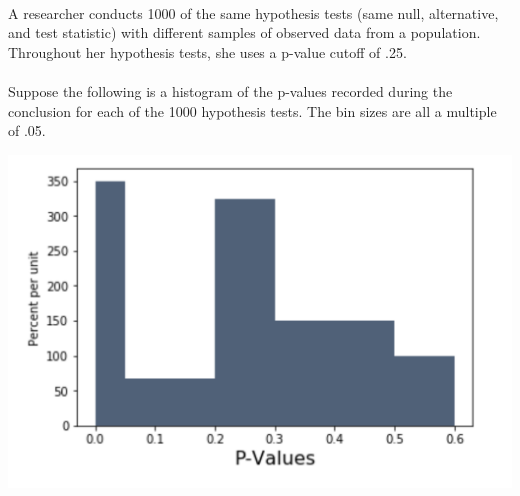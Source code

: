  \\ 

A researcher conducts 1000 of the same hypothesis tests (same null, alternative, and test statistic) with different samples of observed data from a population. Throughout her hypothesis tests, she uses a p-value cutoff of .25. 
\\ \\
Suppose the following is a histogram of the p-values recorded during the conclusion for each of the 1000 hypothesis tests. The bin sizes are all a multiple of .05. 

\begin{center}
\includegraphics[scale=0.5]{phist.png}
\end{center}

